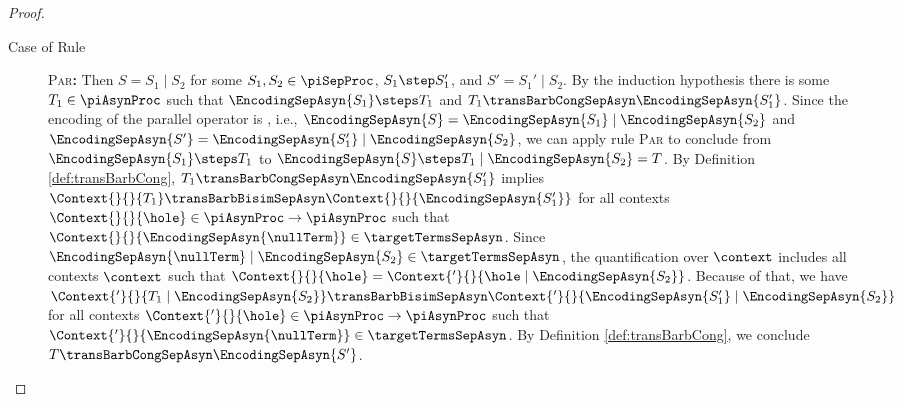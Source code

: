 \documentclass[]{llncs}
\begin{document}
\begin{proof}
\begin{description}
\begin{description}
				\item[Case of Rule] \textsc{Par}\textbf{:} Then $ S = S_1 \mid S_2 $ for some $ S_1, S_2 \in \piSepProc $, $ S_1 \step S_1' $, and $ S' = S_1' \mid S_2 $. By the induction hypothesis there is some $ T_1 \in \piAsynProc $ such that $ \EncodingSepAsyn{S_1} \steps T_1 $ and $ T_1 \transBarbCongSepAsyn \EncodingSepAsyn{S_1'} $. Since the encoding of the parallel operator is \clean, i.e., $ \EncodingSepAsyn{S} = \EncodingSepAsyn{S_1} \mid \EncodingSepAsyn{S_2} $ and $ \EncodingSepAsyn{S'} = \EncodingSepAsyn{S_1'} \mid \EncodingSepAsyn{S_2} $, we can apply rule \textsc{Par} to conclude from $ \EncodingSepAsyn{S_1} \steps T_1 $ to $ \EncodingSepAsyn{S} \steps T_1 \mid \EncodingSepAsyn{S_2} = T $. By Definition \ref{def:transBarbCong}, $ T_1 \transBarbCongSepAsyn \EncodingSepAsyn{S_1'} $ implies $ \Context{}{}{T_1} \transBarbBisimSepAsyn \Context{}{}{\EncodingSepAsyn{S_1'}} $ for all contexts $ \Context{}{}{\hole} \in \piAsynProc \to \piAsynProc $ such that $ \Context{}{}{\EncodingSepAsyn{\nullTerm}} \in \targetTermsSepAsyn $. Since $ \EncodingSepAsyn{\nullTerm} \mid \EncodingSepAsyn{S_2} \in \targetTermsSepAsyn $, the quantification over $ \context $ includes all contexts $ \context $ such that $ \Context{}{}{\hole} = \Context{'}{}{\hole \mid \EncodingSepAsyn{S_2}} $. Because of that, we have $ \Context{'}{}{T_1 \mid \EncodingSepAsyn{S_2}} \transBarbBisimSepAsyn \Context{'}{}{\EncodingSepAsyn{S_1'} \mid \EncodingSepAsyn{S_2}} $ for all contexts $ \Context{'}{}{\hole} \in \piAsynProc \to \piAsynProc $ such that $ \Context{'}{}{\EncodingSepAsyn{\nullTerm}} \in \targetTermsSepAsyn $. By Definition \ref{def:transBarbCong}, we conclude $ T \transBarbCongSepAsyn \EncodingSepAsyn{S'} $.

\end{description}
\end{description}
\end{proof}
\end{document}
